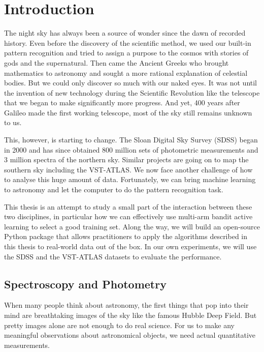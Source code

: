
\chapter{Introduction}
\label{cha:intro}

The night sky has always been a source of wonder since the dawn of recorded history.
Even before the discovery of the scientific method, we used our built-in pattern
recognition and tried to assign a purpose to
the cosmos with stories of gods and the supernatural. Then came the Ancient Greeks who brought
mathematics to astronomy and sought a more rational explanation of celestial bodies.
But we could only discover so much with our naked eyes. It was not until the invention
of new technology during the Scientific Revolution like the telescope that we began to
make significantly more progress. And yet, 400 years after Galileo made the first working
telescope, most of the sky still remains unknown to us.

This, however, is starting to change. The Sloan Digital Sky Survey (SDSS) began
in 2000 and has since obtained 800 million sets of photometric measurements
and 3 million spectra of the northern sky. Similar projects are going on
to map the southern sky including the VST-ATLAS. We now face another challenge of how
to analyse this huge amount of data. Fortunately, we can bring machine learning
to astronomy and let the computer to do the pattern recognition task.

This thesis is an attempt to study a small part of the interaction between these
two disciplines, in particular how we can effectively use multi-arm bandit active
learning to select a good training set. Along the way, we will build an open-source
Python package that allows practitioners to apply the algorithms described in this thesis
to real-world data out of the box. In our own experiments, we will use the SDSS and the
VST-ATLAS datasets to evaluate the performance.



\section{Spectroscopy and Photometry}
\label{sec:spec}

When many people think about astronomy, the first things that pop into their mind are
breathtaking images of the sky like the famous Hubble Deep Field. But pretty images alone
are not enough to do real science. For us to make any meaningful observations about
astronomical objects, we need actual quantitative measurements.

